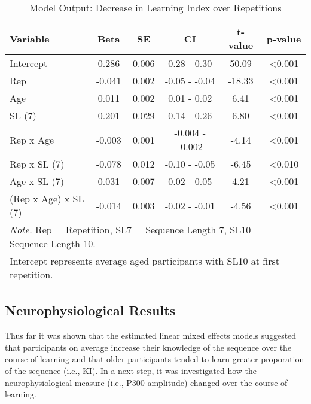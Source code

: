 \begin{table}
\centering
\begin{tabular}{lccccc}
\hline
\textbf{Variable}            & \textbf{Beta} & \textbf{SE}          & \textbf{CI}           & \textbf{t-value} & \textbf{p-value} \\ \hline
Intercept                    & 0.286         & 0.006                & 0.28 - 0.30           & 50.09            & \textless{}0.001 \\
Rep                          & -0.041         & 0.002                & -0.05 - -0.04           & -18.33            & \textless{}0.001 \\
Age                          & 0.011         & 0.002                & 0.01 - 0.02           & 6.41             & \textless{}0.001 \\
SL (7)                       & 0.201         & 0.029                & 0.14 - 0.26           & 6.80             & \textless{}0.001 \\
Rep x Age                    & -0.003         & 0.001                & -0.004 - -0.002         & -4.14             & \textless{}0.001 \\
Rep x SL (7)                 & -0.078         & 0.012                & -0.10 - -0.05         & -6.45             & \textless{}0.010            \\
Age x SL (7)                 & 0.031         & 0.007                & 0.02 - 0.05          & 4.21             & \textless{}0.001 \\ 
(Rep x Age) x SL (7) & -0.014 & 0.003 & -0.02 - -0.01 & -4.56 & \textless{}0.001 \\ \hline
\multicolumn{6}{l}{\small \textit{Note.} Rep = Repetition, SL7 = Sequence Length 7, SL10 = Sequence Length 10.}\\[-0.3cm]
\multicolumn{6}{l}{\small Intercept represents average aged participants with SL10 at first repetition.}\\
\end{tabular}
\caption{Model Output: Decrease in Learning Index over Repetitions}
\label{tab:ReLI}
\end{table}

\subsection{Neurophysiological Results}
Thus far it was shown that the estimated linear mixed effects models suggested that participants on average increase their knowledge of the sequence over the course of learning and that older participants tended to learn greater proporation of the sequence (i.e., KI). In a next step, it was investigated how the neurophysiological measure (i.e., P300 amplitude) changed over the course of learning.
